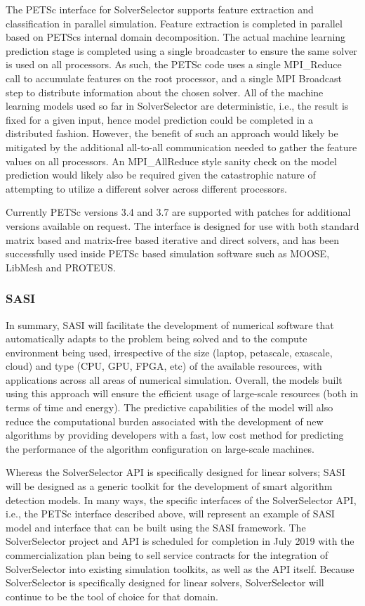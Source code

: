 The PETSc interface for SolverSelector supports feature extraction and classification in parallel simulation. Feature extraction is completed in parallel based on PETScs internal domain decomposition. The actual machine learning prediction stage is completed using a single broadcaster to ensure the same solver is used on all processors. As such, the PETSc code uses a single MPI\_Reduce call to accumulate features on the root processor, and a single MPI Broadcast step to distribute information about the chosen solver. All of the machine learning models used so far in SolverSelector are deterministic, i.e., the result is fixed for a given input, hence model prediction could be completed in a distributed fashion. However, the benefit of such an approach would likely be mitigated by the additional all-to-all communication needed to gather the feature values on all processors. An MPI\_AllReduce style sanity check on the model prediction would likely also be required given the catastrophic nature of attempting to utilize a different solver across different processors.   

Currently PETSc versions 3.4 and 3.7 are supported with patches for additional versions available on request. The interface is designed for use with both standard matrix based and matrix-free based iterative and direct solvers, and has been successfully used inside PETSc based simulation software such as MOOSE, LibMesh and PROTEUS. 

\subsubsection{SASI} 

In summary, SASI will facilitate the development of numerical software that automatically adapts to the problem being solved and to the compute environment being used, irrespective of the size (laptop, petascale, exascale, cloud) and type (CPU, GPU, FPGA, etc) of the available resources, with applications across all areas of numerical simulation. Overall, the models built using this approach will ensure the efficient usage of large-scale resources (both in terms of time and energy). The predictive capabilities of the model will also reduce the computational burden associated with the development of new algorithms by providing developers with a fast, low cost method for predicting the performance of the algorithm configuration on large-scale machines. 

Whereas the SolverSelector API is specifically designed for linear solvers; SASI will be designed as a generic toolkit for the development of smart algorithm detection models. In many ways, the specific interfaces of the SolverSelector API, i.e., the PETSc interface described above, will represent an example of SASI model and interface that can be built using the SASI framework. The SolverSelector project and API is scheduled for completion in July 2019 with the commercialization plan being to sell service contracts for the integration of SolverSelector into existing simulation toolkits, as well as the API itself. Because SolverSelector is specifically designed for linear solvers, SolverSelector will continue to be the tool of choice for that domain. 

